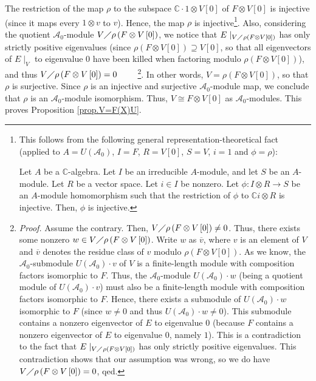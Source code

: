 \documentclass
[numbers=enddot,12pt,final,onecolumn,german,notitlepage]{scrartcl}%
\theoremstyle{definition}
\begin{document}
The restriction of the map $\rho$ to the subspace $\mathbb{C}\cdot1\otimes
V\left[  0\right]  $ of $F\otimes V\left[  0\right]  $ is injective (since it
maps every $1\otimes v$ to $v$). Hence, the map $\rho$ is
injective\footnote{This follows from the following general
representation-theoretical fact (applied to $A=U\left(  \mathcal{A}%
_{0}\right)  $, $I=F$, $R=V\left[  0\right]  $, $S=V$, $i=1$ and $\phi=\rho$):
\par
Let $A$ be a $\mathbb{C}$-algebra. Let $I$ be an irreducible $A$-module, and
let $S$ be an $A$-module. Let $R$ be a vector space. Let $i\in I$ be nonzero.
Let $\phi:I\otimes R\rightarrow S$ be an $A$-module homomorphism such that the
restriction of $\phi$ to $\mathbb{C}i\otimes R$ is injective. Then, $\phi$ is
injective.}. Also, considering the quotient $\mathcal{A}_{0}$-module
$V\diagup\rho\left(  F\otimes V\left[  0\right]  \right)  $, we notice that
$E\mid_{V\diagup\rho\left(  F\otimes V\left[  0\right]  \right)  }$ has only
strictly positive eigenvalues (since $\rho\left(  F\otimes V\left[  0\right]
\right)  \supseteq V\left[  0\right]  $, so that all eigenvectors of
$E\mid_{V}$ to eigenvalue $0$ have been killed when factoring modulo
$\rho\left(  F\otimes V\left[  0\right]  \right)  $), and thus $V\diagup
\rho\left(  F\otimes V\left[  0\right]  \right)  =0$%
\ \ \ \ \footnote{\textit{Proof.} Assume the contrary. Then, $V\diagup
\rho\left(  F\otimes V\left[  0\right]  \right)  \neq0$. Thus, there exists
some nonzero $w\in V\diagup\rho\left(  F\otimes V\left[  0\right]  \right)  $.
Write $w$ as $\overline{v}$, where $v$ is an element of $V$ and $\overline{v}$
denotes the residue class of $v$ modulo $\rho\left(  F\otimes V\left[
0\right]  \right)  $. As we know, the $\mathcal{A}_{0}$-submodule $U\left(
\mathcal{A}_{0}\right)  \cdot v$ of $V$ is a finite-length module with
composition factors isomorphic to $F$. Thus, the $\mathcal{A}_{0}$-module
$U\left(  \mathcal{A}_{0}\right)  \cdot w$ (being a quotient module of
$U\left(  \mathcal{A}_{0}\right)  \cdot v$) must also be a finite-length
module with composition factors isomorphic to $F$. Hence, there exists a
submodule of $U\left(  \mathcal{A}_{0}\right)  \cdot w$ isomorphic to $F$
(since $w\neq0$ and thus $U\left(  \mathcal{A}_{0}\right)  \cdot w\neq0$).
This submodule contains a nonzero eigenvector of $E$ to eigenvalue $0$
(because $F$ contains a nonzero eigenvector of $E$ to eigenvalue $0$, namely
$1$). This is a contradiction to the fact that $E\mid_{V\diagup\rho\left(
F\otimes V\left[  0\right]  \right)  }$ has only strictly positive
eigenvalues. This contradiction shows that our assumption was wrong, so we do
have $V\diagup\rho\left(  F\otimes V\left[  0\right]  \right)  =0$, qed.}. In
other words, $V=\rho\left(  F\otimes V\left[  0\right]  \right)  $, so that
$\rho$ is surjective. Since $\rho$ is an injective and surjective
$\mathcal{A}_{0}$-module map, we conclude that $\rho$ is an $\mathcal{A}_{0}%
$-module isomorphism. Thus, $V\cong F\otimes V\left[  0\right]  $ as
$\mathcal{A}_{0}$-modules. This proves Proposition \ref{prop.V=F(X)U}.
\end{document}
